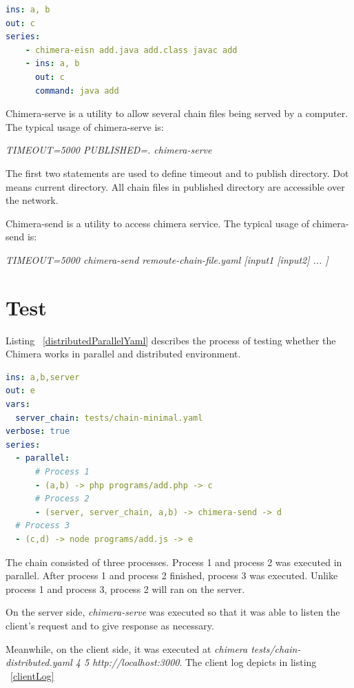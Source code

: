 \documentclass[conference]{IEEEtran}
\begin{document}
\begin{lstlisting}[caption=Chimera-eisn usage example, label=chimeraEisn, language=yaml, basicstyle=\small, breaklines=true]
ins: a, b
out: c
series:
    - chimera-eisn add.java add.class javac add
    - ins: a, b
      out: c
      command: java add
\end{lstlisting}

Chimera-serve is a utility to allow several chain files being served by a computer.
The typical usage of chimera-serve is:

{\it TIMEOUT=5000 PUBLISHED=. chimera-serve}

The first two statements are used to define timeout and to publish directory. Dot means
current directory. All chain files in published directory are accessible over the network.

Chimera-send is a utility to access chimera service.
The typical usage of chimera-send is: 

{\it TIMEOUT=5000 chimera-send remoute-chain-file.yaml [input1 [input2] ... ]}


\section{Test}

Listing ~\ref{distributedParallelYaml} describes the process of testing whether the Chimera works
in parallel and distributed environment.

\begin{lstlisting}[caption=Distributed and Parallel YAML-chain Scenario, label=distributedParallelYaml, language=yaml, basicstyle=\small, breaklines=true]
ins: a,b,server
out: e
vars:
  server_chain: tests/chain-minimal.yaml 
verbose: true
series:
  - parallel:
      # Process 1
      - (a,b) -> php programs/add.php -> c
      # Process 2
      - (server, server_chain, a,b) -> chimera-send -> d
  # Process 3
  - (c,d) -> node programs/add.js -> e
\end{lstlisting}

The chain consisted of three processes. Process 1 and process 2 was executed in parallel.
After process 1 and process 2 finished, process 3 was executed. Unlike process 1 and
process 3, process 2 will ran on the server.

On the server side, {\it chimera-serve} was executed so that it was able to listen the client's request
and to give response as necessary.

Meanwhile, on the client side, it was executed at {\it chimera tests/chain-distributed.yaml 4 5 http://localhost:3000}. The client log depicts in listing ~\ref{clientLog} 
\end{document}
